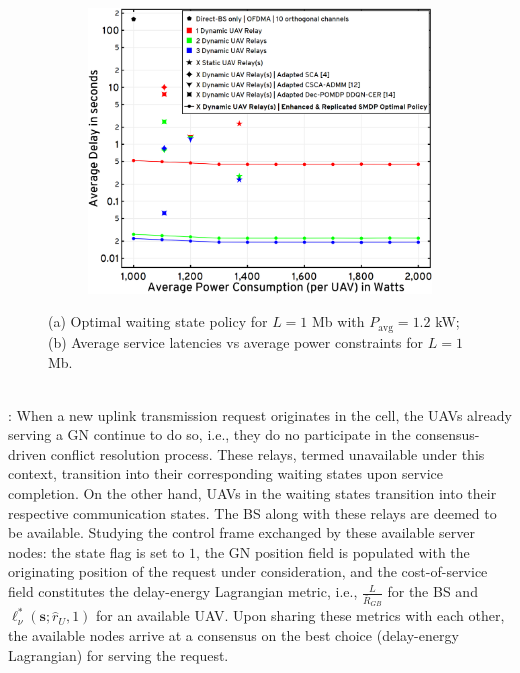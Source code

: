 \documentclass[10pt,twocolumn]{IEEEtran}
\begin{document}
\begin{figure} [t]
\begin{subfigure}{0.5\linewidth}
         \includegraphics[width=1.0\linewidth]{figs/Delay_Power_Performance_1Mb.png}
         \vspace{-4mm}
         \label{F8}
     \end{subfigure}
     \vspace{-2mm}
     \caption{(a) Optimal waiting state policy for $L{=}1$ Mb with $P_{\mathrm{avg}}{=}1.2$ kW; (b) Average service latencies vs average power constraints for $L{=}1$ Mb.}
     \label{F7andF8}
     \vspace{-7mm}
\end{figure}
\\: When a new uplink transmission request originates in the cell, the UAVs already serving a GN continue to do so, i.e., they do no participate in the consensus-driven conflict resolution process. These relays, termed unavailable under this context, transition into their corresponding waiting states upon service completion. On the other hand, UAVs in the waiting states transition into their respective communication states. The BS along with these relays are deemed to be available. Studying the control frame exchanged by these available server nodes: the state flag is set to $1$, the GN position field is populated with the originating position of the request under consideration, and the cost-of-service field constitutes the delay-energy Lagrangian metric, i.e., $\frac{L}{\bar{R}_{GB}}$ for the BS and $\ell_{\nu}^{*}(\mathbf{s};\hat{r}_{U},1)$ for an available UAV. Upon sharing these metrics with each other, the available nodes arrive at a consensus on the best choice (delay-energy Lagrangian) for serving the request.
\end{document}
